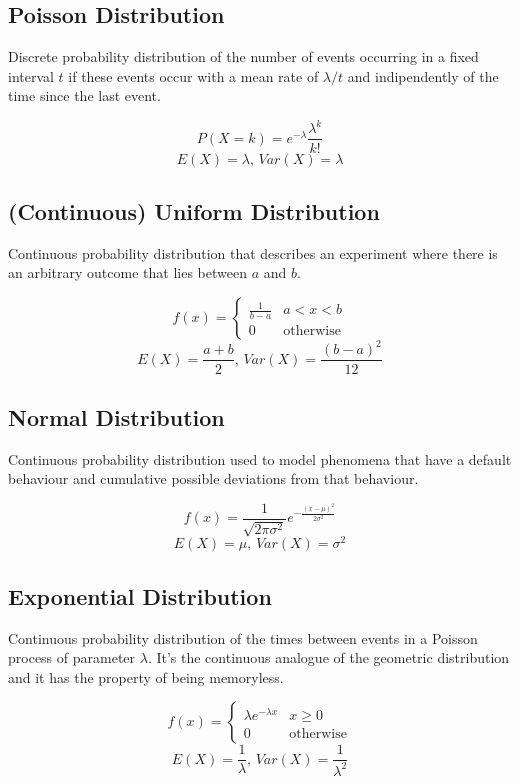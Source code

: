 \subsection{Poisson Distribution}
Discrete probability distribution of the number of events occurring
in a fixed interval $t$ if these events occur with a mean rate of $\lambda / t$
and indipendently of the time since the last event.

\[P(X = k) = e^{-\lambda}\frac{\lambda^k}{k!}\]
\[E(X) = \lambda,\,Var(X) = \lambda\]


\subsection{(Continuous) Uniform Distribution}
Continuous probability distribution that describes an experiment
where there is an arbitrary outcome that lies between $a$ and $b$.

\[f(x) =
	\begin{cases}
		\frac{1}{b-a} & a < x < b \\
		0 & \textrm{otherwise}
	\end{cases}
\]
\[E(X) = \frac{a + b}{2},\,Var(X) = \frac{(b - a)^2}{12}\]


\subsection{Normal Distribution}
Continuous probability distribution used to model phenomena that have
a default behaviour and cumulative possible deviations from that behaviour.

\[f(x) = \frac{1}{\sqrt{2\pi\sigma^2}}e^{-\frac{(x - \mu)^2}{2\sigma^2}}\]
\[E(X) = \mu,\,Var(X) = \sigma^2\]


\subsection{Exponential Distribution}
Continuous probability distribution of the times between events
in a Poisson process of parameter $\lambda$.
It's the continuous analogue of the geometric distribution and
it has the property of being memoryless.

\[f(x) =
	\begin{cases}
		\lambda e^{-\lambda x} & x \ge 0 \\
		0 & \textrm{otherwise}
	\end{cases}
\]
\[E(X) = \frac{1}{\lambda},\,Var(X) = \frac{1}{\lambda^2}\]

